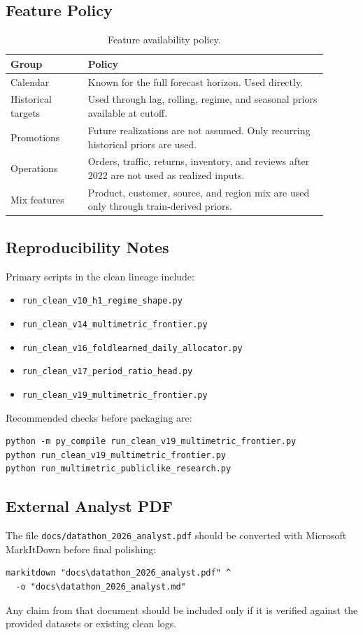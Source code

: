\subsection{Feature Policy}
\begin{table}[h]
\centering
\caption{Feature availability policy.}
\begin{tabular}{p{0.22\linewidth}p{0.68\linewidth}}
\toprule
Group & Policy \\
\midrule
Calendar & Known for the full forecast horizon. Used directly. \\
Historical targets & Used through lag, rolling, regime, and seasonal priors available at cutoff. \\
Promotions & Future realizations are not assumed. Only recurring historical priors are used. \\
Operations & Orders, traffic, returns, inventory, and reviews after 2022 are not used as realized inputs. \\
Mix features & Product, customer, source, and region mix are used only through train-derived priors. \\
\bottomrule
\end{tabular}
\end{table}

\subsection{Reproducibility Notes}
Primary scripts in the clean lineage include:
\begin{itemize}
  \item \texttt{run\_clean\_v10\_h1\_regime\_shape.py}
  \item \texttt{run\_clean\_v14\_multimetric\_frontier.py}
  \item \texttt{run\_clean\_v16\_foldlearned\_daily\_allocator.py}
  \item \texttt{run\_clean\_v17\_period\_ratio\_head.py}
  \item \texttt{run\_clean\_v19\_multimetric\_frontier.py}
\end{itemize}
Recommended checks before packaging are:
\begin{verbatim}
python -m py_compile run_clean_v19_multimetric_frontier.py
python run_clean_v19_multimetric_frontier.py
python run_multimetric_publiclike_research.py
\end{verbatim}

\subsection{External Analyst PDF}
The file \texttt{docs/datathon\_2026\_analyst.pdf} should be converted with Microsoft MarkItDown before final polishing:
\begin{verbatim}
markitdown "docs\datathon_2026_analyst.pdf" ^
  -o "docs\datathon_2026_analyst.md"
\end{verbatim}
Any claim from that document should be included only if it is verified against the provided datasets or existing clean logs.
